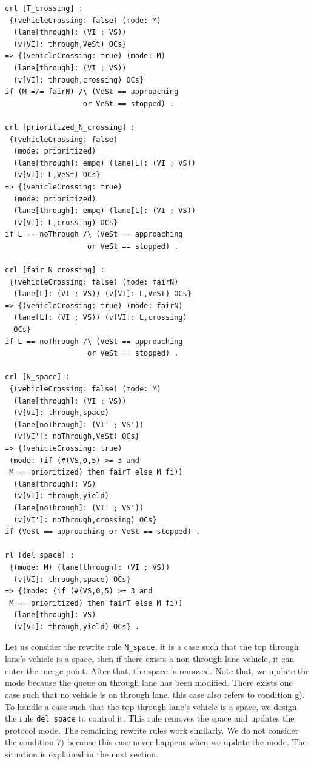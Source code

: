\documentclass[10pt, conference, compsocconf]{IEEEtran}
\begin{document}
\begin{small}
  \begin{verbatim}
crl [T_crossing] : 
 {(vehicleCrossing: false) (mode: M) 
  (lane[through]: (VI ; VS)) 
  (v[VI]: through,VeSt) OCs} 
=> {(vehicleCrossing: true) (mode: M) 
  (lane[through]: (VI ; VS)) 
  (v[VI]: through,crossing) OCs} 
if (M =/= fairN) /\ (VeSt == approaching 
                  or VeSt == stopped) .

crl [prioritized_N_crossing] : 
 {(vehicleCrossing: false) 
  (mode: prioritized) 
  (lane[through]: empq) (lane[L]: (VI ; VS)) 
  (v[VI]: L,VeSt) OCs} 
=> {(vehicleCrossing: true) 
  (mode: prioritized) 
  (lane[through]: empq) (lane[L]: (VI ; VS)) 
  (v[VI]: L,crossing) OCs}
if L == noThrough /\ (VeSt == approaching 
                   or VeSt == stopped) .

crl [fair_N_crossing] : 
 {(vehicleCrossing: false) (mode: fairN) 
  (lane[L]: (VI ; VS)) (v[VI]: L,VeSt) OCs} 
=> {(vehicleCrossing: true) (mode: fairN) 
  (lane[L]: (VI ; VS)) (v[VI]: L,crossing) 
  OCs} 
if L == noThrough /\ (VeSt == approaching 
                   or VeSt == stopped) .

crl [N_space] : 
 {(vehicleCrossing: false) (mode: M)
  (lane[through]: (VI ; VS)) 
  (v[VI]: through,space) 
  (lane[noThrough]: (VI' ; VS')) 
  (v[VI']: noThrough,VeSt) OCs} 
=> {(vehicleCrossing: true) 
 (mode: (if (#(VS,0,5) >= 3 and 
 M == prioritized) then fairT else M fi))
  (lane[through]: VS) 
  (v[VI]: through,yield)
  (lane[noThrough]: (VI' ; VS')) 
  (v[VI']: noThrough,crossing) OCs}
if (VeSt == approaching or VeSt == stopped) .

rl [del_space] : 
 {(mode: M) (lane[through]: (VI ; VS)) 
  (v[VI]: through,space) OCs} 
=> {(mode: (if (#(VS,0,5) >= 3 and 
 M == prioritized) then fairT else M fi))
  (lane[through]: VS) 
  (v[VI]: through,yield) OCs} .
  \end{verbatim}
\end{small}

Let us consider the rewrite rule \verb!N_space!, it is a case such that
the top through lane's vehicle is a space, then if there exists a 
non-through lane vehicle, it can enter the merge point. After that, 
the space is removed. Note that, we update the mode because the queue
on through lane has been modified. There exists one case such that no
vehicle is on through lane, this case also refers to condition g).
To handle a case such that the top through lane's vehicle is a space, we design
the rule \verb!del_space! to control it. This rule removes the space and
updates the protocol mode.
The remaining rewrite rules work similarly.
We do not consider the condition 7) because this case never happens when we update
the mode. The situation is explained in the next section.
\end{document}
